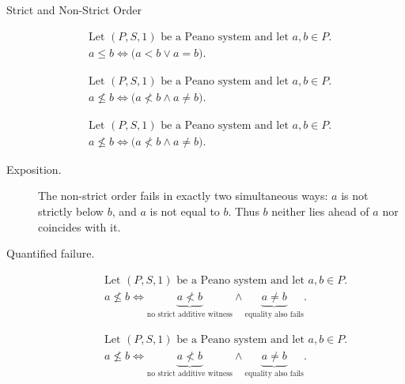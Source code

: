 \begin{topicbox}{Strict and Non-Strict Order}
\begin{remark*}
\[
\begin{aligned}
&\text{Let } (P,S,1) \text{ be a Peano system and let } a,b \in P.\\
&a \le b
\Longleftrightarrow
\bigl(a<b \lor a=b\bigr).
\end{aligned}
\]
\end{remark*}

\begin{remark*}
\[
\begin{aligned}
&\text{Let } (P,S,1) \text{ be a Peano system and let } a,b \in P.\\
&a \not\le b
\Longleftrightarrow
\bigl(a \not< b \land a \neq b\bigr).
\end{aligned}
\]
\end{remark*}

\begin{remark*}
\[
\begin{aligned}
&\text{Let } (P,S,1) \text{ be a Peano system and let } a,b \in P.\\
&a \not\le b
\Longleftrightarrow
\bigl(a \not< b \land a \neq b\bigr).
\end{aligned}
\]
\end{remark*}

\begin{remark*}
\begin{description}
  \item[Exposition.]
  The non-strict order fails in exactly two simultaneous ways: $a$ is not
  strictly below $b$, and $a$ is not equal to $b$. Thus $b$ neither lies ahead
  of $a$ nor coincides with it.
  \item[Quantified failure.]
  \[
  \begin{aligned}
  &\text{Let } (P,S,1) \text{ be a Peano system and let } a,b \in P.\\
  &a \not\le b
  \Longleftrightarrow
  \underbrace{a \not< b}_{\text{no strict additive witness}}
  \land
  \underbrace{a \neq b}_{\text{equality also fails}}.
  \end{aligned}
  \]

\[
  \begin{aligned}
  &\text{Let } (P,S,1) \text{ be a Peano system and let } a,b \in P.\\
  &a \not\le b
  \Longleftrightarrow
  \underbrace{a \not< b}_{\text{no strict additive witness}}
  \land
  \underbrace{a \neq b}_{\text{equality also fails}}.
  \end{aligned}
  \]
\end{description}
\end{remark*}


\end{topicbox}
